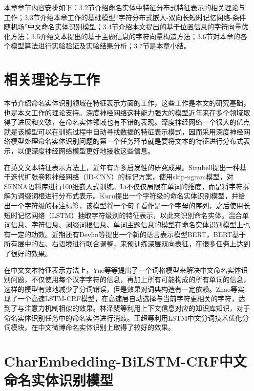 \documentclass[winfonts,master,oneside,nobackinfo]{njuthesis}
\begin{document}
本章章节内容安排如下：3.2节介绍命名实体中特征分布式特征表示的相关理论与工作；3.3节介绍本章工作的基础模型“字符分布式嵌入-双向长短时记忆网络-条件随机场”中文命名实体识别模型；3.4节介绍本文提出的基于位置信息的字符向量优化方法；3.5介绍文本提出的基于主题信息的字符向量构造方法；3.6节对本章的各个模型算法进行实验验证及实验结果分析；3.7节是本章小结。

\section{相关理论与工作}

本节介绍命名实体识别领域在特征表示方面的工作，这些工作是本文的研究基础，也是本文工作的理论支持。深度神经网络这种能力强大的模型近年来在多个领域取得了进展和突破，在命名实体领域也有不错的表现。深度神经网络一个很大的优点就是该模型可以在训练过程中自动寻找数据的特征表示模式，因而采用深度神经网络模型处理命名实体识别问题的第一个任务环节就是要将文本的特征进行分布式表示，以便深度神经网络模型更好地接收这些信息。

在英文文本特征表示方法上，近年有许多启发性的研究成果。Strubell\cite{Strubell}提出一种基于迭代扩张卷积神经网络（ID-CNN）的标记方案，使用skip-ngram模型，对SENNA语料库进行100维嵌入式训练。Li\cite{JLi}不仅仅局限在单词的维度，而是将字符拆解为词缀词根进行分布式表示。Kuru\cite{Kuru}提出一个字符级的命名实体识别模型，并给出一个字符级的标注标签，该模型将一个句子看作是一个字母的序列，之后使用长短时记忆网络（LSTM）抽取字符级别的特征表示，以此来识别命名实体。混合单词信息、字符信息、词缀词根信息、单词主题信息的模型\cite{Strubell,Jansson,Wei}在命名实体识别模型上也有一定的功效。近期还有Devlin等\cite{Devlin}提出一个新的语言表示模型BERT，BERT基于所有层中的左、右语境进行联合调整，来预训练深层双向表征，在很多任务上达到了很好的效果。

在中文文本特征表示方法上，Yue等\cite{Yue}等提出了一个词格模型来解决中文命名实体识别问题，不仅使用每个汉字字符的信息，再加上所有可能构成的所有单词的信息，这样的模型有效地减少了分词错误，但是效果对词典构造有一定依赖。Zhao等\cite{Zhao}实现了一个高速LSTM-CRF模型，在高速层自动选择与当前字符更相关的字符，达到了与注意力机制相似的效果。林泽斐等\cite{lzf}利用上下文信息对应的知识库知识，对于命名实体识别任务中的命名实体进行消歧。王超等\cite{Wang}利用LSTM中文分词技术优化分词模块，在中文微博命名实体识别上取得了较好的效果。

\section{CharEmbedding-BiLSTM-CRF中文命名实体识别模型}
\end{document}
